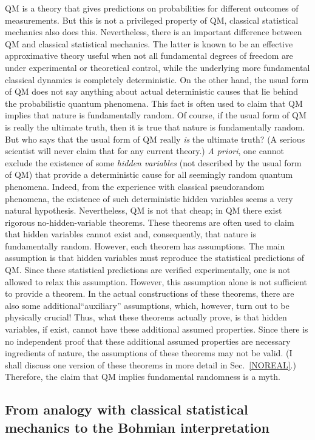 \documentclass[12pt]{article}
\begin{document}
QM is a theory that gives predictions on probabilities
for different outcomes of measurements. But this is not a 
privileged property of QM, classical statistical mechanics also does this.
Nevertheless, there is an important difference between QM and 
classical statistical mechanics. The latter is known to be an effective
approximative theory useful when not all fundamental
degrees of freedom are under experimental or theoretical control, 
while the underlying more fundamental classical dynamics
is completely deterministic. On the other hand, the usual form
of QM does not say anything about actual deterministic causes  
that lie behind the probabilistic quantum phenomena. 
This fact is often used to claim that QM implies that nature 
is fundamentally random. Of course, if the usual form of 
QM is really the ultimate truth, then it is true that nature 
is fundamentally random. But who says that the usual form of QM really 
{\em is} the ultimate truth? (A serious scientist will never 
claim that for any current theory.) {\it A priori}, one cannot exclude
the existence of some {\em hidden variables} (not described by the 
usual form of QM) that provide a deterministic cause for all 
seemingly random quantum phenomena. Indeed, from the experience 
with classical pseudorandom phenomena, the existence of such 
deterministic hidden variables seems a very natural hypothesis.
Nevertheless, QM is not that cheap; in QM there exist 
rigorous no-hidden-variable theorems. These theorems are often 
used to claim that hidden variables cannot exist and, consequently, 
that nature is fundamentally random. However, each theorem has 
assumptions. The main assumption is that hidden 
variables must reproduce the statistical predictions of QM.
Since these statistical predictions are verified experimentally, 
one is not allowed to relax this assumption. However, this assumption 
alone is not sufficient to provide a theorem. In the actual constructions
of these theorems, there are also some 
additional``auxiliary'' assumptions, which, 
however, turn out to be physically crucial! Thus,
what these theorems actually prove, is that hidden variables, if exist, 
cannot have these additional assumed properties.
Since there is no independent proof that these additional 
assumed properties are necessary ingredients of nature, 
the assumptions of these theorems may not be valid.
(I shall discuss one version of these theorems in more detail in 
Sec.~\ref{NOREAL}.)
Therefore, the claim that QM implies fundamental randomness is 
a myth. 

\subsection{From analogy with classical statistical mechanics
to the Bohmian interpretation}
\end{document}
